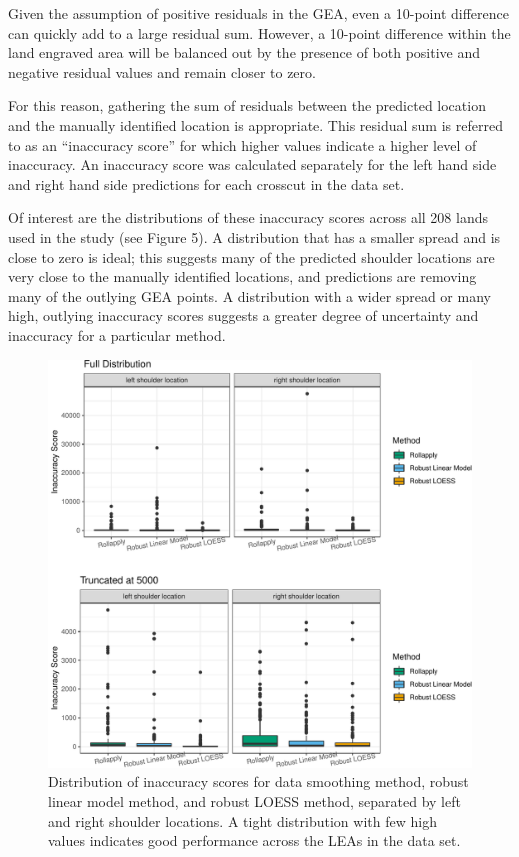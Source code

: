 \documentclass[]{article}
\begin{document}
Given the assumption of positive residuals in the GEA, even a 10-point
difference can quickly add to a large residual sum. However, a 10-point
difference within the land engraved area will be balanced out by the
presence of both positive and negative residual values and remain closer
to zero.

For this reason, gathering the sum of residuals between the predicted
location and the manually identified location is appropriate. This
residual sum is referred to as an ``inaccuracy score'' for which higher
values indicate a higher level of inaccuracy. An inaccuracy score was
calculated separately for the left hand side and right hand side
predictions for each crosscut in the data set.

Of interest are the distributions of these inaccuracy scores across all
208 lands used in the study (see Figure 5). A distribution that has a
smaller spread and is close to zero is ideal; this suggests many of the
predicted shoulder locations are very close to the manually identified
locations, and predictions are removing many of the outlying GEA points.
A distribution with a wider spread or many high, outlying inaccuracy
scores suggests a greater degree of uncertainty and inaccuracy for a
particular method.

\begin{figure}
\centering
\includegraphics{writeup_files/figure-latex/unnamed-chunk-5-1.pdf}
\caption{Distribution of inaccuracy scores for data smoothing method,
robust linear model method, and robust LOESS method, separated by left
and right shoulder locations. A tight distribution with few high values
indicates good performance across the LEAs in the data set.}
\end{figure}
\end{document}
